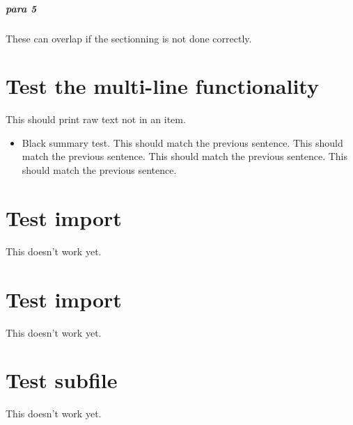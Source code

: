 \paragraph{para 5}
\label{autosec:7}
These can overlap if the sectionning is not done correctly.
\chapter{Test the multi-line functionality}
\label{autosec:7}
This should print raw text not in an item.
    \begin{itemize}[noitemsep]
        \item Black summary test.
This should match the previous sentence.
This should match the previous sentence.
This should match the previous sentence.
This should match the previous sentence.
    \end{itemize}
\chapter{Test import}
\label{autosec:8}
This doesn't work yet.
\chapter{Test import}
\label{autosec:9}
This doesn't work yet.
\chapter{Test subfile}
\label{autosec:10}
This doesn't work yet.


